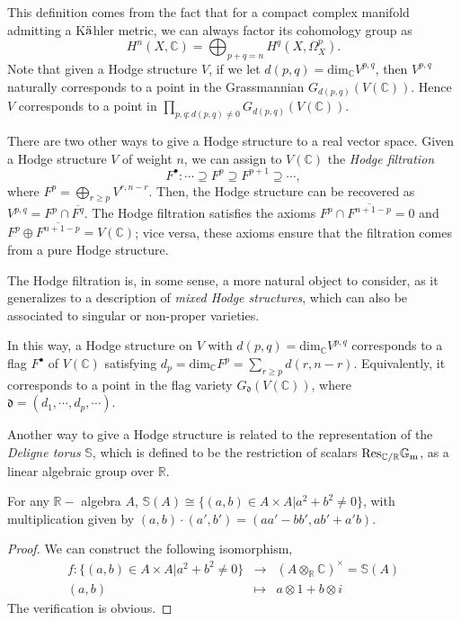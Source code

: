 \begin{remark}
 \label{remark-Hodge-structures}
 This definition comes from the fact that for a compact complex manifold admitting a K$\rm \ddot a$hler metric, we can always factor its cohomology group as
$$
H^n(X, \mathbb C)= \bigoplus _{ p+q=n}H^q(X, \Omega^p_X).
$$
Note that given a Hodge structure $V$, if we let $d(p,q)= \text{dim}_\mathbb C V^{p,q}$, then $V^{p,q}$ naturally corresponds to a point in the Grassmannian $G_{d(p,q)}(V(\mathbb C))$. Hence $V$ corresponds to a point in $\prod_{p,q:d(p,q)\ne 0} G_{d(p,q)}(V(\mathbb C))$.
\end{remark}

There are two other ways to give a Hodge structure to a real vector space. Given a Hodge structure $V$ of weight $n$, we can assign to $V(\mathbb  C)$ the {\it Hodge filtration}
$$
F^ \bullet : \cdots \supseteq F^p \supseteq F^{p+1} \supseteq \cdots,
$$
where $F^p = \bigoplus _{r \geq p} V^{r,n-r}$. Then, the Hodge structure can be recovered as $V^{p,q}=F^p \cap \overline{F^q}$. The Hodge filtration satisfies the axioms $F^p \cap \overline{F^{n+1-p}} = 0$ and $F^p \oplus \overline{F^{n+1-p}} = V(\mathbb C)$; vice versa, these axioms ensure that the filtration comes from a pure Hodge structure.

The Hodge filtration is, in some sense, a more natural object to consider, as it generalizes to a description of \emph{mixed Hodge structures}, which can also be associated to singular or non-proper varieties.

In this way, a Hodge structure on $V$ with $d(p,q)= \text{dim}_\mathbb C V^{p,q}$ corresponds to a flag $F^\bullet$ of $V(\mathbb C)$ satisfying $d_p=\text{dim}_\mathbb C F^p= \sum_{r \ge p} d(r,n-r)$.  Equivalently, it corresponds to a point in the flag variety $G_ \mathfrak d(V(\mathbb C)) $, where $\mathfrak d= (d_1,\cdots,d_p,\cdots)$.

Another way to give a Hodge structure is related to the representation of the {\it Deligne torus} $\mathbb S$, which is defined to be the restriction of scalars $\rm Res_{\mathbb C/ \mathbb R} \mathbb G_m$, as a linear algebraic group over $\mathbb R$.

\begin{lemma}
 \label{lemma-Deligne-torus}
  For any $\mathbb R-$ algebra $A$, $\mathbb S(A)\cong \{(a,b)\in A \times A| a^2+b^2 \ne 0\} $, with multiplication given by $(a,b)\cdot (a',b')=(aa'-bb',ab'+a'b)$.
\end{lemma} 

\begin{proof}
We can construct the following isomorphism, 
\begin{eqnarray*}
f:\{(a,b)\in A \times A| a^2+b^2 \ne 0\} &\to& (A \otimes _\mathbb R \mathbb C)^ \times=\mathbb S(A) \\
(a,b) &\mapsto& a \otimes 1+b\otimes i
\end{eqnarray*}
The verification is obvious.
\end{proof}

